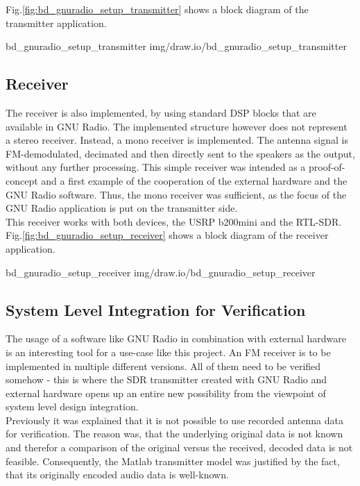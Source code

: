\noindent
Fig.\ref{fig:bd_gnuradio_setup_transmitter} shows a block diagram of the transmitter application.

 {bd_gnuradio_setup_transmitter} {img/draw.io/bd_gnuradio_setup_transmitter}


\subsection{Receiver}

The receiver is also implemented, by using standard DSP blocks that are available in GNU Radio.
The implemented structure however does not represent a stereo receiver.
Instead, a mono receiver is implemented.
The antenna signal is FM-demodulated, decimated and then directly sent to the speakers as the output, without any further processing.
This simple receiver was intended as a proof-of-concept and a first example of the cooperation of the external hardware and the GNU Radio software.
Thus, the mono receiver was sufficient, as the focus of the GNU Radio application is put on the transmitter side.\\

This receiver works with both devices, the USRP b200mini and the RTL-SDR.
Fig.\ref{fig:bd_gnuradio_setup_receiver} shows a block diagram of the receiver application.

 {bd_gnuradio_setup_receiver} {img/draw.io/bd_gnuradio_setup_receiver}

\subsection{System Level Integration for Verification}

The usage of a software like GNU Radio in combination with external hardware is an interesting tool for a use-case like this project.
An FM receiver is to be implemented in multiple different versions.
All of them need to be verified somehow - this is where the SDR transmitter created with GNU Radio and external hardware opens up an entire new possibility from the viewpoint of system level design integration.\\

Previously it was explained that it is not possible to use recorded antenna data for verification.
The reason was, that the underlying original data is not known and therefor a comparison of the original versus the received, decoded data is not feasible.
Consequently, the Matlab transmitter model was justified by the fact, that its originally encoded audio data is well-known.\\

